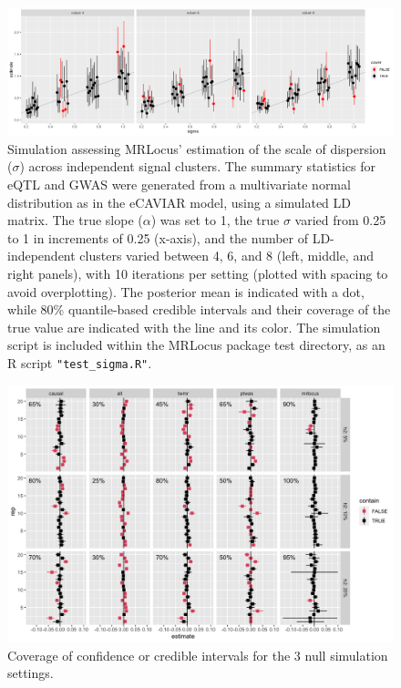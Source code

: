 \documentclass[11pt]{article}
\begin{document}
\begin{figure}[!ht]
  \centering
  \includegraphics[width=\textwidth]{figs/sigma_est.png}
  \caption{Simulation assessing MRLocus' estimation of the scale of
    dispersion ($\sigma$) across independent signal
    clusters. The summary statistics for eQTL and GWAS were generated from
    a multivariate normal distribution as in the eCAVIAR model, using
    a simulated LD matrix. The true slope ($\alpha$) was set to 1, the
    true $\sigma$ varied from 0.25 to 1 in increments of 0.25
    (x-axis), and the number of LD-independent clusters varied between
    4, 6, and 8 (left, middle, and right panels), with 10 iterations
    per setting (plotted with spacing to avoid overplotting). The
    posterior mean is indicated with a dot, while 80\% quantile-based
    credible intervals and their coverage of the true value are
    indicated with the line and its color. The simulation script is
    included within the MRLocus package test directory, as an R
    script \texttt{"test\_sigma.R"}.}
\end{figure}

\begin{figure}[!ht]
  \centering
  \includegraphics[width=\textwidth]{figs/nullplot.png}
  \caption{Coverage of confidence or credible intervals for the 3 null
    simulation settings.}
\end{figure}
\end{document}
